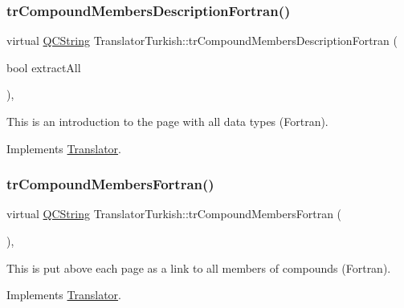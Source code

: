 \subsubsection{\texorpdfstring{trCompoundMembersDescriptionFortran()}{trCompoundMembersDescriptionFortran()}}
{\footnotesize\ttfamily virtual \mbox{\hyperlink{class_q_c_string}{Q\+C\+String}} Translator\+Turkish\+::tr\+Compound\+Members\+Description\+Fortran (\begin{DoxyParamCaption}\item[{bool}]{extract\+All }\end{DoxyParamCaption})\hspace{0.3cm}{\ttfamily [inline]}, {\ttfamily [virtual]}}

This is an introduction to the page with all data types (Fortran). 

Implements \mbox{\hyperlink{class_translator}{Translator}}.

\mbox{\label{class_translator_turkish_a7d3c90f60ab00d91da27bd8161c739be}} 
\subsubsection{\texorpdfstring{trCompoundMembersFortran()}{trCompoundMembersFortran()}}
{\footnotesize\ttfamily virtual \mbox{\hyperlink{class_q_c_string}{Q\+C\+String}} Translator\+Turkish\+::tr\+Compound\+Members\+Fortran (\begin{DoxyParamCaption}{ }\end{DoxyParamCaption})\hspace{0.3cm}{\ttfamily [inline]}, {\ttfamily [virtual]}}

This is put above each page as a link to all members of compounds (Fortran). 

Implements \mbox{\hyperlink{class_translator}{Translator}}.

\mbox{\label{class_translator_turkish_adba7c126f83ae730a6e3f3fd909a67b1}} 
